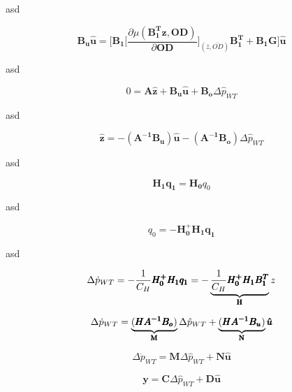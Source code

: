 asd

\begin{equation}
  \pmb{B_u}\pmb{\hat{u}} = \bigg[\pmb{B_1} \bigg[ \frac{\partial{\mu(\pmb{{B_1^{T}}}\pmb{z}, \pmb{OD})}}{{\partial{\pmb{OD}}}}  \bigg]_{(\bar{z}, \bar{OD})} \pmb{{B_1^{T}}} + \pmb{B_1}\pmb{G}\bigg] \pmb{\hat{u}} 
\label{Bumatrix}
\end{equation}

asd

\begin{equation}
 0 = \pmb{A} \pmb{\hat{z}} + \pmb{B_u} \pmb{\hat{u}} + \pmb{B_o} \Delta \hat{p}_{WT}    
 \label{statespace_2}
\end{equation}

asd

\begin{equation}
 \pmb{\hat{z}} = -(\pmb{A^{-1}}\pmb{B_u})\pmb{\hat{u}} - (\pmb{A^{-1}}\pmb{B_o})\Delta \hat{p}_{WT}    
 \label{statespace_2}
\end{equation}

asd

\begin{equation}
 \pmb{H_1}\pmb{q_1} = \pmb{H_0}q_0  
 \label{currentlaw_1}
\end{equation}

asd

\begin{equation}
q_0 = -\pmb{H^+_0}\pmb{H_1}\pmb{q_1}
 \label{currentlaw_2}
\end{equation}

asd

\begin{equation}
\Delta \dot{p}_{WT} = - \frac{1}{C_H} \pmb{H^+_0}\pmb{H_1}\pmb{q_1} = - \underbrace{\frac{1}{C_H} \pmb{H^+_0}\pmb{H_1}\pmb{{B_1^{T}}}}_\text{\pmb{H}} z
 \label{currentlaw_2}
\end{equation}

\begin{equation}
\Delta \dot{p}_{WT} = \underbrace{(\pmb{H}\pmb{A^{-1}}\pmb{B_o})}_\text{\pmb{M}}\Delta \hat{p}_{WT}  + \underbrace{(\pmb{H}\pmb{A^{-1}}\pmb{B_u})}_\text{\pmb{N}}\pmb{\hat{u}}  
 \label{statespace_3}
\end{equation}

\begin{equation}
\Delta \dot{p}_{WT} = \pmb{M} \Delta \hat{p}_{WT}  + \pmb{N}\pmb{\hat{u}}  
 \label{statespace_4}
\end{equation}

\begin{equation}
\pmb{y} = \pmb{C} \Delta \hat{p}_{WT}  + \pmb{D}\pmb{\hat{u}}  
 \label{statespace_5}
\end{equation}

